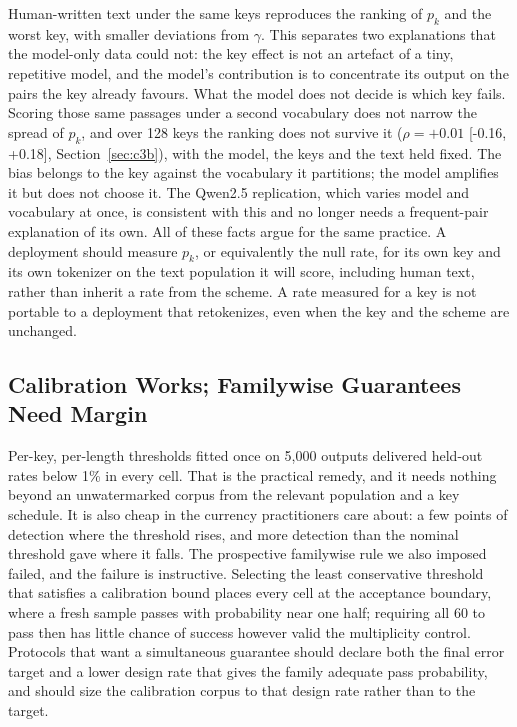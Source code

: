 \documentclass[conference]{IEEEtran}
\begin{document}
Human-written text under the same keys reproduces the ranking of $p_k$ and the
worst key, with smaller deviations from $\gamma$. This separates two explanations
that the model-only data could not: the key effect is not an artefact of a tiny,
repetitive model, and the model's contribution is to concentrate its output on
the pairs the key already favours. What the model does not decide is which key
fails. Scoring those same passages under a second vocabulary does not narrow the spread
of $p_k$, and over 128 keys the ranking does not survive it ($\rho=+0.01$
[-0.16, +0.18], Section~\ref{sec:c3b}), with the model,
the keys and the text held fixed. The
bias belongs to the key against the vocabulary it partitions; the model amplifies
it but does not choose it. The Qwen2.5 replication, which varies model and
vocabulary at once, is consistent with this and no longer needs a
frequent-pair explanation of its own. All of these facts argue for the same
practice. A deployment
should measure $p_k$, or equivalently the null rate, for its own key and its own
tokenizer on the text population it will score, including human text, rather than
inherit a rate from the scheme. A rate measured for a key is not portable to a
deployment that retokenizes, even when the key and the scheme are unchanged.

\subsection{Calibration Works; Familywise Guarantees Need Margin}

Per-key, per-length thresholds fitted once on 5,000 outputs delivered held-out
rates below 1\% in every cell. That is the practical remedy, and it needs nothing
beyond an unwatermarked corpus from the relevant population and a key schedule.
It is also cheap in the currency practitioners care about: a few points of
detection where the threshold rises, and more detection than the nominal
threshold gave where it falls.
The prospective familywise rule we also imposed failed, and the failure is
instructive. Selecting the least conservative threshold that satisfies a
calibration bound places every cell at the acceptance boundary, where a fresh
sample passes with probability near one half; requiring all 60 to pass then has
little chance of success however valid the multiplicity control. Protocols that
want a simultaneous guarantee should declare both the final error target and a
lower design rate that gives the family adequate pass probability, and should
size the calibration corpus to that design rate rather than to the target.
\end{document}
